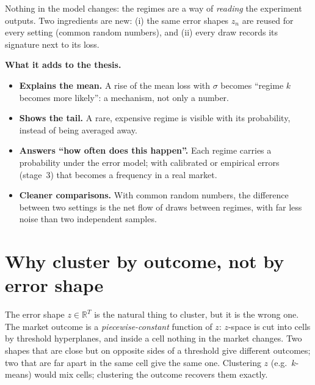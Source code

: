 \documentclass[10pt,a4paper]{article}
\begin{document}
Nothing in the model changes: the regimes are a way of \emph{reading} the experiment outputs. Two ingredients
are new: (i) the same error shapes $z_n$ are reused for every setting (common random numbers), and (ii) every
draw records its signature next to its loss.

\textbf{What it adds to the thesis.}
\begin{itemize}
  \item \textbf{Explains the mean.} A rise of the mean loss with $\sigma$ becomes ``regime $k$ becomes more
    likely'': a mechanism, not only a number.
  \item \textbf{Shows the tail.} A rare, expensive regime is visible with its probability, instead of being
    averaged away.
  \item \textbf{Answers ``how often does this happen''.} Each regime carries a probability under the error
    model; with calibrated or empirical errors (stage~3) that becomes a frequency in a real market.
  \item \textbf{Cleaner comparisons.} With common random numbers, the difference between two settings is the
    net flow of draws between regimes, with far less noise than two independent samples.
\end{itemize}

\section{Why cluster by outcome, not by error shape}

The error shape $z\in\mathbb R^T$ is the natural thing to cluster, but it is the wrong one. The market
outcome is a \emph{piecewise-constant} function of $z$: $z$-space is cut into cells by threshold hyperplanes,
and inside a cell nothing in the market changes. Two shapes that are close but on opposite sides of a
threshold give different outcomes; two that are far apart in the same cell give the same one. Clustering
$z$ (e.g.\ $k$-means) would mix cells; clustering the outcome recovers them exactly.
\end{document}

